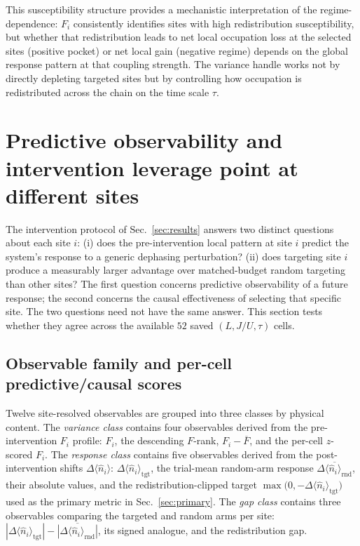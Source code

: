 \documentclass[aps,prresearch,reprint,amsmath,amssymb,longbibliography,floatfix]{revtex4-2}
\newcommand{\Fi}{F_i}
\newcommand{\nop}{\hat{n}}
\begin{document}
This susceptibility structure provides a mechanistic interpretation of
the regime-dependence: $\Fi$ consistently identifies sites with high
redistribution susceptibility, but whether that redistribution leads to
net local occupation loss at the selected sites (positive pocket) or net
local gain (negative regime) depends on the global response pattern at
that coupling strength.
The variance handle works not by directly depleting targeted sites but by
controlling how occupation is redistributed across the chain on the
time scale $\tau$.

\section{Predictive observability and intervention leverage point at different sites}
\label{sec:t1}

The intervention protocol of Sec.~\ref{sec:results} answers two
distinct questions about each site $i$:
(i) does the pre-intervention local pattern at site $i$ predict the
system's response to a generic dephasing perturbation?
(ii) does targeting site $i$ produce a measurably larger advantage over
matched-budget random targeting than other sites?
The first question concerns predictive observability of a future
response; the second concerns the causal effectiveness of selecting that
specific site. The two questions need not have the same answer.
This section tests whether they agree across the available
$52$ saved $(L, J/U, \tau)$ cells.

\subsection{Observable family and per-cell predictive/causal scores}

Twelve site-resolved observables are grouped into three classes by
physical content.
The \emph{variance class} contains four observables derived from the
pre-intervention $\Fi$ profile: $F_i$, the descending $F$-rank,
$F_i - \overline{F}$, and the per-cell $z$-scored $F_i$.
The \emph{response class} contains five observables derived from the
post-intervention shifts $\Delta\langle\nop_i\rangle$:
$\Delta\langle\nop_i\rangle_{\mathrm{tgt}}$, the trial-mean random-arm
response $\overline{\Delta\langle\nop_i\rangle_{\mathrm{rnd}}}$, their
absolute values, and the redistribution-clipped target
$\max\bigl(0,-\Delta\langle\nop_i\rangle_{\mathrm{tgt}}\bigr)$ used as
the primary metric in Sec.~\ref{sec:primary}.
The \emph{gap class} contains three observables comparing the targeted
and random arms per site: $|\Delta\langle\nop_i\rangle_{\mathrm{tgt}}|
- \overline{|\Delta\langle\nop_i\rangle_{\mathrm{rnd}}|}$, its signed
analogue, and the redistribution gap.
\end{document}
